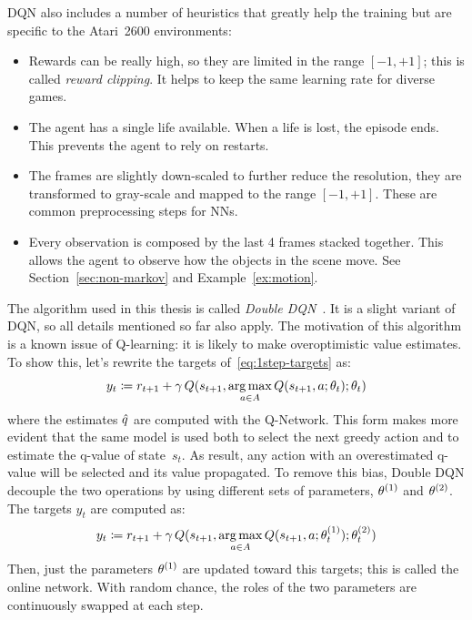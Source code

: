 DQN also includes a number of heuristics that greatly help the training
but are specific to the Atari~2600 environments:
\begin{itemize}
	\item Rewards can be really high, so they are limited in the range $[-1,
		+1]$; this is called \emph{reward clipping}. It helps to keep the same
		learning rate for diverse games.
	\item The agent has a single life available. When a life is lost, the
		episode ends. This prevents the agent to rely on restarts.
	\item The frames are slightly down-scaled to further reduce the resolution,
		they are transformed to gray-scale and mapped to the range $[-1, +1]$.
		These are common preprocessing steps for NNs.
	\item Every observation is composed by the last 4 frames stacked together.
		This allows the agent to observe how the objects in the scene move.
		See Section~\ref{sec:non-markov} and Example~\vref{ex:motion}.
\end{itemize}

The algorithm used in this thesis is called \emph{Double
DQN}~\cite{bib:double-q}. It is a slight variant of DQN, so all details
mentioned so far also apply. The motivation of this algorithm is a known issue
of Q-learning: it is likely to make overoptimistic value estimates.
To show this, let's rewrite the targets of~\eqref{eq:1step-targets} as:
\begin{equation}
	y_t \coloneqq r_{t+1} + \gamma \, Q(s_{t+1}, \operatorname*{arg\,max}_{a \in A} Q(s_{t+1},
	a; \theta_t); \theta_t)
\end{equation}
where the estimates $\hat{q}$ are computed with the Q-Network. This form makes
more evident that the same model is used both to select the next greedy action
and to estimate the q-value of state~$s_t$. As result, any action with an
overestimated q-value will be selected and its value propagated. To remove
this bias, Double DQN decouple the two operations by using different sets of
parameters, $\theta^{(1)}$ and $\theta^{(2)}$. The targets $y_t$ are
computed as:
\begin{equation}
	y_t \coloneqq r_{t+1} + \gamma \, Q(s_{t+1}, \operatorname*{arg\,max}_{a \in A} Q(s_{t+1},
	a; \theta_t^{(1)}); \theta_t^{(2)})
	\label{eq:double-q-targets}
\end{equation}
Then, just the parameters $\theta^{(1)}$ are updated toward this targets;
this is called the online network. With random chance, the roles of the two
parameters are continuously swapped at each step.


